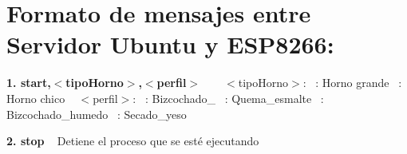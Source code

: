 \hypertarget{index_HowTo}{}\section{Formato de mensajes entre Servidor Ubuntu y E\+S\+P8266\+:}\label{index_HowTo}
{\bfseries 1. start,$<$tipo\+Horno$>$,$<$perfil$>$ }~\newline
 ~\newline
 $<$tipo\+Horno$>$\+: ~\+: Horno grande ~\+: Horno chico ~\newline
$<$perfil$>$\+: ~\+: Bizcochado\+\_ ~\+: Quema\+\_\+esmalte ~\+: Bizcochado\+\_\+humedo ~\+: Secado\+\_\+yeso

{\bfseries 2. stop }~\newline
  Detiene el proceso que se esté ejecutando 